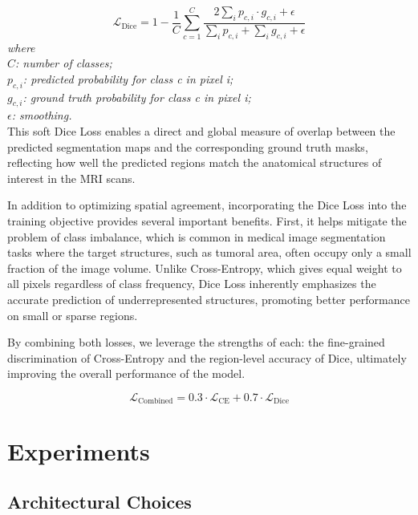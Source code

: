 \documentclass[10pt,twocolumn,letterpaper]{article}
\begin{document}
\begin{equation}
\mathcal{L}_{\text{Dice}} = 1 - \frac{1}{C} \sum_{c=1}^{C} \frac{2 \sum_i p_{c,i} \cdot g_{c,i} + \epsilon}{\sum_i p_{c,i} + \sum_i g_{c,i} + \epsilon}
\end{equation}
\textit{where}\\
$C$\textit{: number of classes;}\\
$p_{c,i}$\textit{: predicted probability for class c in pixel i;}\\
$g_{c,i}$\textit{: ground truth probability for class c in pixel i;}\\
$\epsilon$\textit{: smoothing.}\\

This soft Dice Loss enables a direct and global measure of overlap between the predicted segmentation maps and the corresponding ground truth masks, reflecting how well the predicted regions match the anatomical structures of interest in the MRI scans.

In addition to optimizing spatial agreement, incorporating the Dice Loss into the training objective provides several important benefits. First, it helps mitigate the problem of class imbalance, which is common in medical image segmentation tasks where the target structures, such as tumoral area, often occupy only a small fraction of the image volume. Unlike Cross-Entropy, which gives equal weight to all pixels regardless of class frequency, Dice Loss inherently emphasizes the accurate prediction of underrepresented structures, promoting better performance on small or sparse regions.

By combining both losses, we leverage the strengths of each: the fine-grained discrimination of Cross-Entropy and the region-level accuracy of Dice, ultimately improving the overall performance of the model.

\begin{equation}
\mathcal{L}_{\text{Combined}} = 0.3 \cdot \mathcal{L}_{\text{CE}} + 0.7 \cdot \mathcal{L}_{\text{Dice}}
\end{equation}


\section{Experiments}

\subsection{Architectural Choices} \label{architectural_choices}
\end{document}
